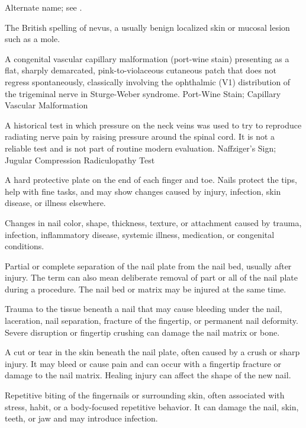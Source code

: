  Alternate name; see .

 The British spelling of nevus, a usually benign localized skin or mucosal lesion such as a mole.

 A congenital vascular capillary malformation (port-wine stain) presenting as a flat, sharply demarcated, pink-to-violaceous cutaneous patch that does not regress spontaneously, classically involving the ophthalmic (V1) distribution of the trigeminal nerve in Sturge-Weber syndrome.
\synonyms
Port-Wine Stain; Capillary Vascular Malformation

 A historical test in which pressure on the neck veins was used to try to reproduce radiating nerve pain by raising pressure around the spinal cord. It is not a reliable test and is not part of routine modern evaluation.
\synonyms
Naffziger's Sign; Jugular Compression Radiculopathy Test

 A hard protective plate on the end of each finger and toe. Nails protect the tips, help with fine tasks, and may show changes caused by injury, infection, skin disease, or illness elsewhere.

 Changes in nail color, shape, thickness, texture, or attachment caused by trauma, infection, inflammatory disease, systemic illness, medication, or congenital conditions.

 Partial or complete separation of the nail
  plate from the nail bed, usually after injury. The term can also mean
  deliberate removal of part or all of the nail plate during a
  procedure. The nail bed or matrix may be injured at the same time.

 Trauma to the tissue beneath a nail that may cause bleeding under the nail, laceration, nail separation, fracture of the fingertip, or permanent nail deformity. Severe disruption or fingertip crushing can damage the nail matrix or bone.

 A cut or tear in the skin beneath the
  nail plate, often caused by a crush or sharp injury. It may bleed or
  cause pain and can occur with a fingertip fracture or damage to the
  nail matrix. Healing injury can affect the shape of the new nail.

 Repetitive biting of the fingernails or surrounding skin, often associated with stress, habit, or a body-focused repetitive behavior. It can damage the nail, skin, teeth, or jaw and may introduce infection.

